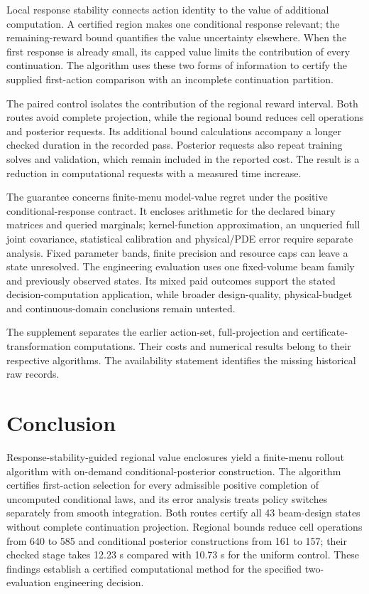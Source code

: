 \documentclass[]{interact}
\begin{document}
Local response stability connects action identity to the value of additional computation. A certified region makes one conditional response relevant; the remaining-reward bound quantifies the value uncertainty elsewhere. When the first response is already small, its capped value limits the contribution of every continuation. The algorithm uses these two forms of information to certify the supplied first-action comparison with an incomplete continuation partition.

The paired control isolates the contribution of the regional reward interval. Both routes avoid complete projection, while the regional bound reduces cell operations and posterior requests. Its additional bound calculations accompany a longer checked duration in the recorded pass. Posterior requests also repeat training solves and validation, which remain included in the reported cost. The result is a reduction in computational requests with a measured time increase.

The guarantee concerns finite-menu model-value regret under the positive conditional-response contract. It encloses arithmetic for the declared binary matrices and queried marginals; kernel-function approximation, an unqueried full joint covariance, statistical calibration and physical/PDE error require separate analysis. Fixed parameter bands, finite precision and resource caps can leave a state unresolved. The engineering evaluation uses one fixed-volume beam family and previously observed states. Its mixed paid outcomes support the stated decision-computation application, while broader design-quality, physical-budget and continuous-domain conclusions remain untested.

The supplement separates the earlier action-set, full-projection and certificate-transformation computations. Their costs and numerical results belong to their respective algorithms. The availability statement identifies the missing historical raw records.

\section{Conclusion}

Response-stability-guided regional value enclosures yield a finite-menu rollout algorithm with on-demand conditional-posterior construction. The algorithm certifies first-action selection for every admissible positive completion of uncomputed conditional laws, and its error analysis treats policy switches separately from smooth integration. Both routes certify all 43 beam-design states without complete continuation projection. Regional bounds reduce cell operations from 640 to 585 and conditional posterior constructions from 161 to 157; their checked stage takes 12.23 s compared with 10.73 s for the uniform control. These findings establish a certified computational method for the specified two-evaluation engineering decision.
\end{document}
